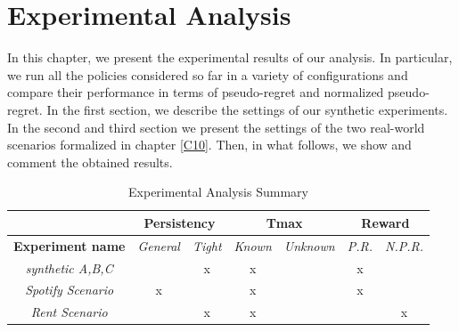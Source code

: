 \chapter{Experimental Analysis}\label{C11}

In this chapter, we present the experimental results of our analysis. In particular, we run all the policies considered so far in a variety of configurations and compare their performance in terms of pseudo-regret and normalized pseudo-regret. In the first section, we describe the settings of our synthetic experiments. In the second and third section we present the settings of the two real-world scenarios formalized in chapter \ref{C10}. Then, in what follows, we show and comment the obtained results.

\iffalse
\begin{table}[h]
	\centering
	\caption{Experimental Analysis Summary}
	\begin{tabular}{|c|c|c|c|c|c|c|} 
		\hhline{~------|}
		\multicolumn{1}{l|}{}     & \multicolumn{2}{c|}{{\cellcolor[rgb]{0.878,0.878,0.878}}\textbf{Persistency}}                              & \multicolumn{2}{c|}{\textbf{Tmax}} & \multicolumn{2}{c|}{{\cellcolor[rgb]{0.878,0.878,0.878}}\textbf{Reward}}                                 \\ 
		\hline
		\textbf{Experiment name}  & {\cellcolor[rgb]{0.878,0.878,0.878}}\textit{General} & {\cellcolor[rgb]{0.878,0.878,0.878}}\textit{Tight} & \textit{Known} & \textit{Unknown}  & {\cellcolor[rgb]{0.878,0.878,0.878}}\textit{P.R.} & {\cellcolor[rgb]{0.878,0.878,0.878}}\textit{N.P.R.}  \\ 
		\hline
		\textit{synthetic A,B,C}      & {\cellcolor[rgb]{0.878,0.878,0.878}}                 & {\cellcolor[rgb]{0.878,0.878,0.878}}x               & x              &                   & {\cellcolor[rgb]{0.878,0.878,0.878}}x             & {\cellcolor[rgb]{0.878,0.878,0.878}}                 \\ 
		\hline
		\textit{Spotify Scenario} & {\cellcolor[rgb]{0.878,0.878,0.878}}x                & {\cellcolor[rgb]{0.878,0.878,0.878}}                & x              &                   & {\cellcolor[rgb]{0.878,0.878,0.878}}x             & {\cellcolor[rgb]{0.878,0.878,0.878}}                 \\ 
		\hline
		\textit{Rent Scenario}    & {\cellcolor[rgb]{0.878,0.878,0.878}}                 & {\cellcolor[rgb]{0.878,0.878,0.878}}x               & x              &                   & {\cellcolor[rgb]{0.878,0.878,0.878}}              & {\cellcolor[rgb]{0.878,0.878,0.878}}x                \\
		\hline
	\end{tabular}

\end{table}

